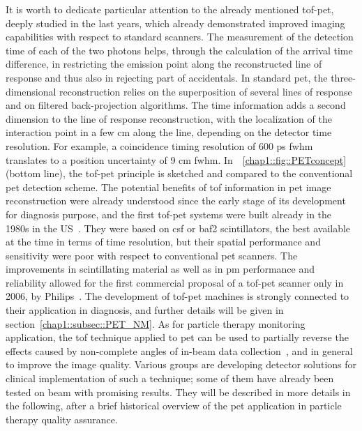 It is worth to dedicate particular attention to the already mentioned \gls{tof}-\gls{pet}, deeply studied in the last years, which already demonstrated improved imaging capabilities with respect to standard scanners. The measurement of the detection time of each of the two photons helps, through the calculation of the arrival time difference, in restricting the emission point along the reconstructed line of response and thus also in rejecting part of accidentals. In standard \gls{pet}, the three-dimensional reconstruction relies on the superposition of several lines of response and on filtered back-projection algorithms. The time information adds a second dimension to the line of response reconstruction, with the localization of the interaction point in a few cm along the line, depending on the detector time resolution. For example, a coincidence timing resolution of 600 ps \gls{fwhm} translates to a position uncertainty of 9 cm \gls{fwhm}. In~\figurename~\ref{chap1::fig::PETconcept} (bottom line), the \gls{tof}-\gls{pet} principle is sketched and compared to the conventional \gls{pet} detection scheme. 
The potential benefits of \gls{tof} information in \gls{pet} image reconstruction were already understood since the early stage of its development for diagnosis purpose, and the first \gls{tof}-\gls{pet} systems were built already in the 1980s in the US~\parencite{Gariod1982}. They were based on \gls{csf} or \gls{baf2} scintillators, the best available at the time in terms of time resolution, but their spatial performance and sensitivity were poor with respect to conventional \gls{pet} scanners. The improvements in scintillating material as well as in \gls{pm} performance and reliability allowed for the first commercial proposal of a \gls{tof}-\gls{pet} scanner only in 2006, by Philips~\parencite{Surti2007}. The development of \gls{tof}-\gls{pet} machines is strongly connected to their application in diagnosis, and further details will be given in section~\ref{chap1::subsec::PET_NM}. As for particle therapy monitoring application, the \gls{tof} technique applied to \gls{pet} can be used to partially reverse the effects caused by non-complete angles of in-beam data collection~\parencite{Crespo2006}, and in general to improve the image quality. Various groups are developing detector solutions for clinical implementation of such a technique; some of them have already been tested on beam with promising results. They will be described in more details in the following, after a brief historical overview of the \gls{pet} application in particle therapy quality assurance. 

